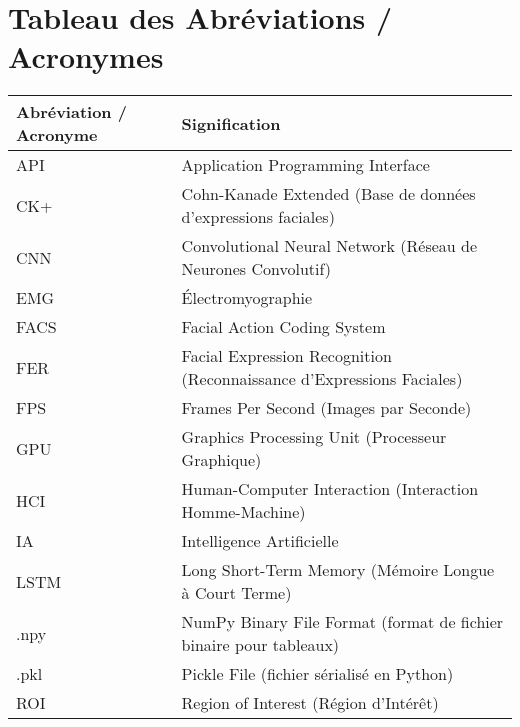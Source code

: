 \documentclass[
]{article}
\author{}
\date{}
\begin{document}
\hypertarget{tableau-des-abruxe9viations-acronymes}{%
\section{Tableau des Abréviations / Acronymes}\label{tableau-des-abruxe9viations-acronymes}}

\begin{longtable}[]{@{}ll@{}}
\toprule
Abréviation / Acronyme & Signification \\
\midrule
\endhead
API & Application Programming Interface \\
CK+ & Cohn-Kanade Extended (Base de données d'expressions faciales) \\
CNN & Convolutional Neural Network (Réseau de Neurones Convolutif) \\
EMG & Électromyographie \\
FACS & Facial Action Coding System \\
FER & Facial Expression Recognition (Reconnaissance d'Expressions Faciales) \\
FPS & Frames Per Second (Images par Seconde) \\
GPU & Graphics Processing Unit (Processeur Graphique) \\
HCI & Human-Computer Interaction (Interaction Homme-Machine) \\
IA & Intelligence Artificielle \\
LSTM & Long Short-Term Memory (Mémoire Longue à Court Terme) \\
.npy & NumPy Binary File Format (format de fichier binaire pour tableaux) \\
.pkl & Pickle File (fichier sérialisé en Python) \\
ROI & Region of Interest (Région d'Intérêt) \\
\bottomrule
\end{longtable}
\end{document}
